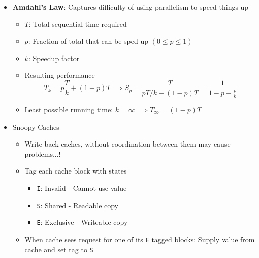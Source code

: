 \documentclass[12pt]{article}
\begin{document}
{\begin{itemize}
\begin{itemize}
\begin{itemize}
		\end{itemize}
		\item \textbf{Efficiency}: $E_p = S_p/p = \frac{T_1}{pT_p}$
		\begin{itemize}
			\item Measures the overhead due to parallelization
		\end{itemize}
	\end{itemize}
	\item \textbf{Amdahl's Law}: Captures difficulty of using parallelism to speed things up
	\begin{itemize}
		\item $T$: Total sequential time required
		\item $p$: Fraction of total that can be sped up $(0\leq p\leq 1)$
		\item $k$: Speedup factor
		\item Resulting performance
		$$T_k = p\frac{T}{k} + (1-p)T \implies S_p = \frac{T}{pT/k + (1-p)T} = \frac{1}{1-p + \frac{p}{k}}$$
		\item Least possible running time: $k=\infty \implies T_\infty = (1-p)T$
	\end{itemize}
	\item Snoopy Caches
	\begin{itemize}
		\item Write-back caches, without coordination between them may cause problems...!
		\item Tag each cache block with states
		\begin{itemize}
			\item \texttt{I}: Invalid - Cannot use value
			\item \texttt{S}: Shared - Readable copy
			\item \texttt{E}: Exclusive - Writeable copy
		\end{itemize}
		\item When cache sees request for one of its \texttt{E} tagged blocks: Supply value from cache and set tag to \texttt{S}
	\end{itemize}
\end{itemize}

}
\end{document}
